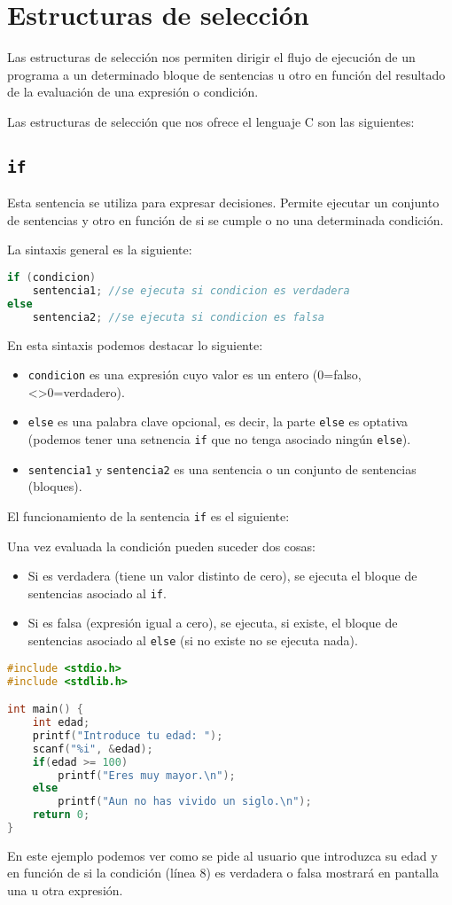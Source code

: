 \section{Estructuras de selección}
Las estructuras de selección nos permiten dirigir el flujo de ejecución de un programa a un determinado bloque de sentencias u otro en función del resultado de la evaluación de una expresión o condición.

Las estructuras de selección que nos ofrece el lenguaje C son las siguientes:
\subsection{\texttt{if}}{
Esta sentencia se utiliza para expresar decisiones. Permite ejecutar un conjunto de sentencias y otro en función de si se cumple o no una determinada condición.

La sintaxis general es la siguiente:
\begin{lstlisting}[language=C]
if (condicion)
    sentencia1;	//se ejecuta si condicion es verdadera
else
    sentencia2;	//se ejecuta si condicion es falsa
\end{lstlisting}
En esta sintaxis podemos destacar lo siguiente:
\begin{itemize}
	\item \texttt{condicion} es una expresión cuyo valor es un entero (0=falso, <>0=verdadero).
	\item \texttt{else} es una palabra clave opcional, es decir, la parte \texttt{else} es optativa (podemos tener una setnencia \texttt{if} que no tenga asociado ningún \texttt{else}).
	\item \texttt{sentencia1} y \texttt{sentencia2} es una sentencia o un conjunto de sentencias (bloques).
\end{itemize}
El funcionamiento de la sentencia \texttt{if} es el siguiente:

Una vez evaluada la condición pueden suceder dos cosas:
\begin{itemize}
	\item Si es verdadera (tiene un valor distinto de cero), se ejecuta el bloque de sentencias asociado al \texttt{if}.
	\item Si es falsa (expresión igual a cero), se ejecuta, si existe, el bloque de sentencias asociado al \texttt{else} (si no existe no se ejecuta nada).
\end{itemize}
\begin{Ejemplo}
\begin{lstlisting}[language=C]
#include <stdio.h>
#include <stdlib.h>

int main() {
    int edad;
    printf("Introduce tu edad: ");
    scanf("%i", &edad);
    if(edad >= 100)
        printf("Eres muy mayor.\n");
    else
        printf("Aun no has vivido un siglo.\n");
    return 0;
}
\end{lstlisting}
\Explicacion
En este ejemplo podemos ver como se pide al usuario que introduzca su edad y en función de si la condición (línea 8) es verdadera o falsa mostrará en pantalla una u otra expresión.
\end{Ejemplo}
}
